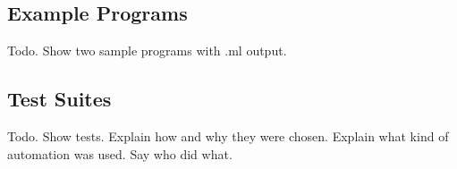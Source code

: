 \subsection{Example Programs}
Todo. Show two sample programs with .ml output.\\

\subsection{Test Suites}
Todo. Show tests. Explain how and why they were chosen. Explain what kind of automation was used. Say who did what.\\